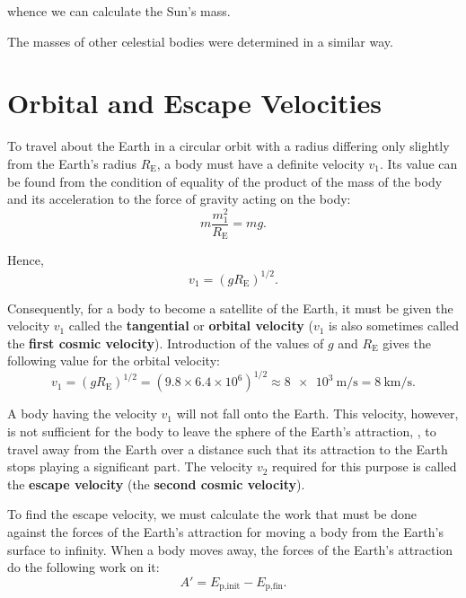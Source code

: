 \noindent
whence we can calculate the Sun's mass.

The masses of other celestial bodies were determined in a similar way.

\section{Orbital and Escape Velocities}\label{sec:6_4}

To travel about the Earth in a circular orbit with a radius differing only slightly from the Earth's radius $R_{\text{E}}$, a body must have a definite velocity $v_1$. Its value can be found from the condition of equality of the product of the mass of the body and its acceleration to the force of gravity acting on the body:
\begin{equation*}
	m\frac{m_1^2}{R_{\text{E}}} = mg.
\end{equation*}

\noindent
Hence,
\begin{equation}\label{eq:6_24}
	v_1 = (gR_{\text{E}})^{1/2}.
\end{equation}

Consequently, for a body to become a satellite of the Earth, it must be given the velocity $v_1$ called the \textbf{tangential} or \textbf{orbital velocity} ($v_1$ is also sometimes called the \textbf{first cosmic velocity}). Introduction of the values of $g$ and $R_{\text{E}}$ gives the following value for the orbital velocity:
\begin{equation*}
	v_1 = (gR_{\text{E}})^{1/2} = (9.8 \times 6.4 \times 10^6)^{1/2} \approx \SI{8e3}{\metre\per\second} = \SI{8}{\kilo\metre\per\second}.
\end{equation*}

A body having the velocity $v_1$ will not fall onto the Earth. This velocity, however, is not sufficient for the body to leave the sphere of the Earth's attraction, \ie, to travel away from the Earth over a distance such that its attraction to the Earth stops playing a significant part. The velocity $v_2$ required for this purpose is called the \textbf{escape velocity} (the \textbf{second cosmic velocity}).

To find the escape velocity, we must calculate the work that must be done against the forces of the Earth's attraction for moving a body from the Earth's surface to infinity. When a body moves away, the forces of the Earth's attraction do the following work on it:
\begin{equation*}
	A' = E_{\text{p,init}} - E_{\text{p,fin}}.
\end{equation*}

